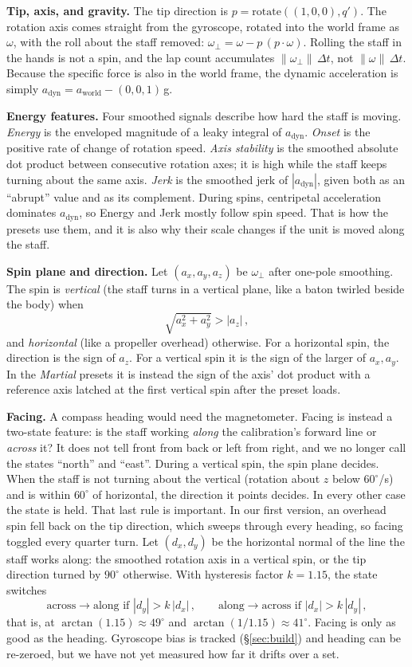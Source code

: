 \documentclass[sigconf,nonacm]{acmart}
\newcommand{\preset}[1]{\textit{#1}}
\begin{document}
\textbf{Tip, axis, and gravity.} The tip direction is $p = \mathrm{rotate}((1,0,0), q')$. The
rotation axis comes straight from the gyroscope, rotated into the world frame as $\omega$, with the
roll about the staff removed: $\omega_\perp = \omega - p\,(p\cdot\omega)$. Rolling the staff in the
hands is not a spin, and the lap count accumulates $\lVert\omega_\perp\rVert\,\Delta t$, not
$\lVert\omega\rVert\,\Delta t$. Because the specific force is also in the world frame, the dynamic
acceleration is simply $a_{\text{dyn}} = a_{\text{world}} - (0,0,1)$\,g.

\textbf{Energy features.} Four smoothed signals describe how hard the staff is moving.
\emph{Energy} is the enveloped magnitude of a leaky integral of $a_{\text{dyn}}$. \emph{Onset} is the
positive rate of change of rotation speed. \emph{Axis stability} is the smoothed absolute dot product
between consecutive rotation axes; it is high while the staff keeps turning about the same axis.
\emph{Jerk} is the smoothed jerk of $|a_{\text{dyn}}|$, given both as an ``abrupt'' value and as its
complement. During spins, centripetal acceleration dominates $a_{\text{dyn}}$, so Energy and Jerk
mostly follow spin speed. That is how the presets use them, and it is also why their scale changes
if the unit is moved along the staff.

\textbf{Spin plane and direction.} Let $(a_x,a_y,a_z)$ be $\omega_\perp$ after one-pole smoothing.
The spin is \emph{vertical} (the staff turns in a vertical plane, like a baton twirled beside the
body) when
\[
\sqrt{a_x^2 + a_y^2} > |a_z|\,,
\]
and \emph{horizontal} (like a propeller overhead) otherwise. For a horizontal spin, the direction is
the sign of $a_z$. For a vertical spin it is the sign of the larger of $a_x, a_y$. In the
\preset{Martial} presets it is instead the sign of the axis' dot product with a reference axis
latched at the first vertical spin after the preset loads.

\textbf{Facing.} A compass heading would need the magnetometer. Facing is instead a two-state
feature: is the staff working \emph{along} the calibration's forward line or \emph{across} it? It
does not tell front from back or left from right, and we no longer call the states ``north'' and
``east''. During a vertical spin, the spin plane decides. When the staff is not turning about the
vertical (rotation about $z$ below $60^\circ$/s) and is within $60^\circ$ of horizontal, the
direction it points decides. In every other case the state is held. That last rule is important. In
our first version, an overhead spin fell back on the tip direction, which sweeps through every
heading, so facing toggled every quarter turn. Let $(d_x,d_y)$ be the horizontal normal of the line
the staff works along: the smoothed rotation axis in a vertical spin, or the tip direction turned by
$90^\circ$ otherwise. With hysteresis factor $k = 1.15$, the state switches
\[
\text{across}\rightarrow\text{along if } |d_y| > k\,|d_x|\,,\qquad
\text{along}\rightarrow\text{across if } |d_x| > k\,|d_y|\,,
\]
that is, at $\arctan(1.15) \approx 49^\circ$ and $\arctan(1/1.15) \approx 41^\circ$. Facing is only as
good as the heading. Gyroscope bias is tracked (\S\ref{sec:build}) and heading can be re-zeroed, but
we have not yet measured how far it drifts over a set.
\end{document}
